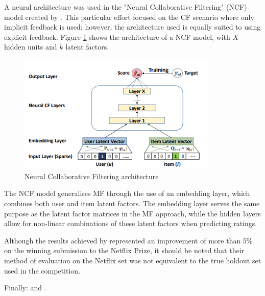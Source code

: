 A neural architecture was used in the "Neural Collaborative Filtering" (NCF) model created by \cite{he2017neural}. This particular effort focused on the CF scenario where only implicit feedback is used; however, the architecture used is equally suited to using explicit feedback. Figure \ref{fig:ncf-arch} shows the architecture of a NCF model, with $X$ hidden units and $k$ latent factors.

\begin{figure}[H]
\centering
\includegraphics[width=9.5cm]{Figures/2_neural-cf.png}
\decoRule
\caption[Neural Collaborative Filtering]{Neural Collaborative Filtering architecture \parencite{he2017neural}}
\label{fig:ncf-arch}
\end{figure}

The NCF model generalises MF through the use of an embedding layer, which combines both user and item latent factors. The embedding layer serves the same purpose as the latent factor matrices in the MF approach, while the hidden layers allow for non-linear combinations of these latent factors when predicting ratings.

Although the results achieved by \citeauthor{sedhain2015autorec} represented an improvement of more than 5\% on the winning submission to the Netflix Prize, it should be noted that their method of evaluation on the Netflix set was not equivalent to the true holdout set used in the competition.

Finally: \parencite{rendle2019difficulty} and \parencite{dacrema2019we}.